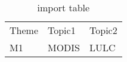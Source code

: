 \documentclass{report}
\begin{document}
\lipsum[10]\

\lipsum[11]\

\begin{table}[H]

	\centering
	\caption{import table}
	\label{tab:xls table}
	\begin{tabular}{p{0.9in}p{0.9in}p{0.9in}}
		Theme & Topic1 & Topic2\\
		M1 & MODIS & LULC\\

		
	
	\end{tabular}

\end{table}
\end{document}

